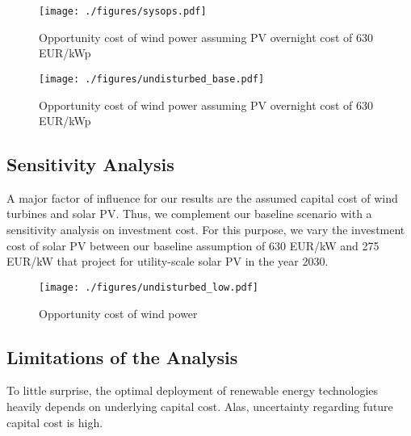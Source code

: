 \documentclass[final, 3p, times]{elsarticle} %
\begin{document}
    \begin{figure*}
        \centering
        \texttt{[image: ./figures/sysops.pdf]}
        \caption{Opportunity cost of wind power assuming PV overnight cost of 630 EUR/kWp}
        \label{figure:system-operation-base}
    \end{figure*}




    \begin{figure*}
        \centering
        \texttt{[image: ./figures/undisturbed\_base.pdf]}
        \caption{Opportunity cost of wind power assuming PV overnight cost of 630 EUR/kWp}
        \label{figure:opportunity-cost-base}
    \end{figure*}

    \subsection{Sensitivity Analysis} \label{subsec:sensitivity}
    A major factor of influence for our results are the assumed capital cost of wind turbines and solar PV.
    Thus, we complement our baseline scenario with a sensitivity analysis on investment cost.
    For this purpose, we vary the investment cost of solar PV between our baseline assumption of 630 EUR/kW and 275
    EUR/kW that \cite{Vartiainen2019} project for utility-scale solar PV in the year 2030.

    \begin{figure*}
        \centering
        \texttt{[image: ./figures/undisturbed\_low.pdf]}
        \caption{Opportunity cost of wind power}
    \end{figure*}


    \subsection{Limitations of the Analysis}
    To little surprise, the optimal deployment of renewable energy technologies heavily depends on underlying capital
    cost.
    Alas, uncertainty regarding future capital cost is high.
\end{document}
